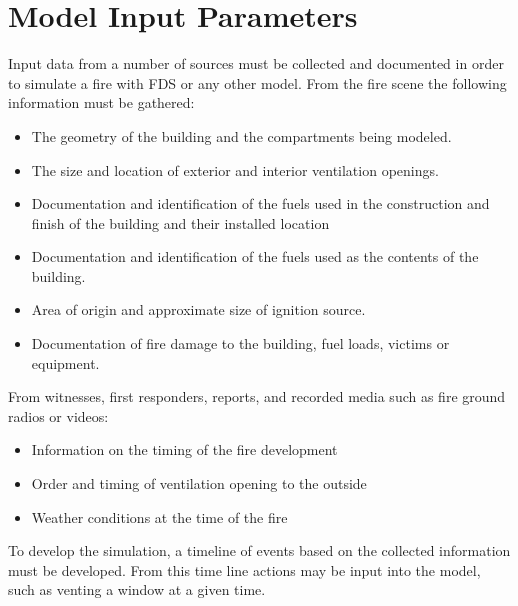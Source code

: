 \documentclass[11pt,oneside]{book}
\begin{document}
\chapter{Model Input Parameters}
Input data from a number of sources must be collected and documented in order to simulate a fire with FDS or any other model. 
From the fire scene the following information must be gathered:
\begin{itemize}
\item The geometry of the building and the compartments being modeled.
\item The size and location of exterior and interior ventilation openings. 
\item Documentation and identification of the fuels used in the construction and finish of the building and their installed location
\item Documentation and identification of the fuels used as the contents of the building. 
\item Area of origin and approximate size of ignition source.
\item Documentation of fire damage to the building, fuel loads, victims or equipment.
\end{itemize}
From witnesses, first responders, reports, and recorded media such as fire ground radios or videos:
\begin{itemize}
\item Information on the timing of the fire development
\item Order and timing of ventilation opening to the outside
\item Weather conditions at the time of the fire
\end{itemize}
To develop the simulation, a timeline of events based on the collected information must be developed.   From this time line actions may be input into the model, such as venting a window at a given time. 
  
\end{document}
